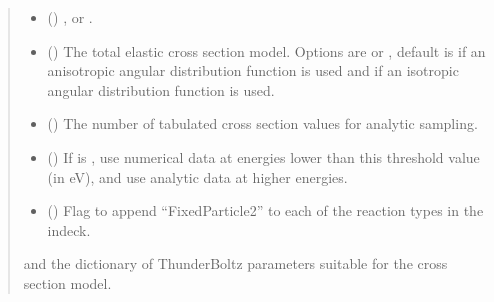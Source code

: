 \documentclass[letterpaper,10pt,english,openany,oneside]{sphinxmanual}
\begin{document}
\begin{fulllineitems}
\begin{quote}
\begin{description}
\begin{itemize}
\item {} 
\sphinxAtStartPar
{} () \textendash{} , or .

\item {} 
\sphinxAtStartPar
{} () \textendash{} The total elastic cross section model. Options are
 or , default is  if an anisotropic
angular distribution function is used and  if an isotropic
angular distribution function is used.

\item {} 
\sphinxAtStartPar
{} () \textendash{} The number of tabulated cross section values for analytic
sampling.

\item {} 
\sphinxAtStartPar
{} () \textendash{} If  is , use numerical data
at energies lower than this threshold value (in eV), and use analytic
data at higher energies.

\item {} 
\sphinxAtStartPar
{} () \textendash{} Flag to append “FixedParticle2” to each of the
reaction types in the indeck.

\end{itemize}

\sphinxAtStartPar
\begin{description}
\sphinxAtStartPar
and the dictionary of ThunderBoltz parameters suitable
for the cross section model.


\end{description}
\end{description}
\end{quote}
\end{fulllineitems}
\end{document}

